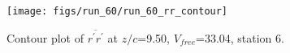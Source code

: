\begin{figure}[H]
\centering
\texttt{[image: figs/run\_60/run\_60\_rr\_contour]}
\caption{Contour plot of $\overline{r^\prime r^\prime}$ at $z/c$=9.50, $V_{free}$=33.04, station 6.}
\label{fig:run_60_rr_contour}
\end{figure}


